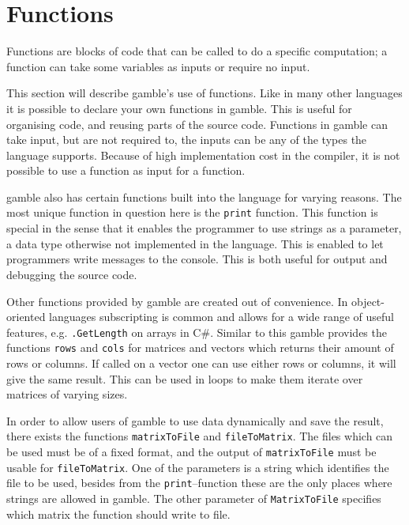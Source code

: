 \section{Functions}\label{sec:funcs}
Functions are blocks of code that can be called to do a specific computation; a function can take some variables as inputs or require no input.

This section will describe \gls{gamble}'s use of functions. 
Like in many other languages it is possible to declare your own functions in \gls{gamble}.
This is useful for organising code, and reusing parts of the source code.
Functions in \gls{gamble} can take input, but are not required to, the inputs can be any of the types the language supports.
Because of high implementation cost in the compiler, it is not possible to use a function as input for a function.

\gls{gamble} also has certain functions built into the language for varying reasons.
The most unique function in question here is the \texttt{print} function.
This function is special in the sense that it enables the programmer to use strings as a parameter, a data type otherwise not implemented in the language.
This is enabled to let programmers write messages to the console.
This is both useful for output and debugging the source code.

Other functions provided by \gls{gamble} are created out of convenience.
In object-oriented languages subscripting is common and allows for a wide range of useful features, e.g. \texttt{.GetLength} on arrays in C\#.
Similar to this \gls{gamble} provides the functions \texttt{rows} and \texttt{cols} for matrices and vectors which returns their amount of rows or columns.
If called on a vector one can use either rows or columns, it will give the same result.
This can be used in loops to make them iterate over matrices of varying sizes.

In order to allow users of \gls{gamble} to use data dynamically and save the result, there exists the functions \texttt{matrixToFile} and \texttt{fileToMatrix}. 
The files which can be used must be of a fixed format, and the output of \texttt{matrixToFile} must be usable for \texttt{fileToMatrix}.
One of the parameters is a string which identifies the file to be used, besides from the \texttt{print}--function these are the only places where strings are allowed in \gls{gamble}.
The other parameter of \texttt{MatrixToFile} specifies which matrix the function should write to file.

